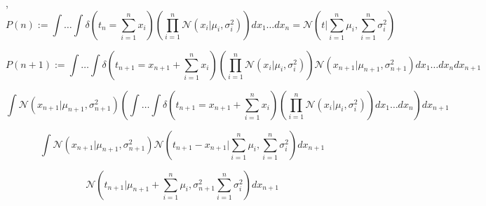 \documentclass[article]{jss}
\newif\ifen
\newif\ifes
\newcommand{\en}[1]{\ifen#1\fi}
\newcommand{\es}[1]{\ifes#1\fi}
\newcommand{\N}{\mathcal{N}}
\begin{document}
\en{Given},
\begin{equation}
 P(n) :=\int \dots \int \delta(t_n= \sum_{i=1}^n x_i ) \left( \prod_{i=1}^n \N(x_i|\mu_i,\sigma_i^2) \right) dx_1 \dots dx_n = \N(t|\sum_{i=1}^n \mu_i,\sum_{i=1}^n \sigma_i^2 )
\end{equation}
%
\en{We want to see that $P(n+1)$ is valid.}
\es{Queremos ver que $P(n+1)$ es válida.}
%
\begin{equation}
 P(n+1) := \int \dots \int \delta(t_{n+1}=x_{n+1} + \sum_{i=1}^{n} x_i ) \left( \prod_{i=1}^{n} \N(x_i|\mu_i,\sigma_i^2) \right) \N(x_{n+1}|\mu_{n+1},\sigma_{n+1}^2) dx_1 \dots dx_{n} dx_{n+1}
\end{equation}
%
\en{By independence}
\es{Por independencia}
\begin{equation}
 \int \N(x_{n+1}|\mu_{n+1},\sigma_{n+1}^2) \left( \int \dots \int \delta(t_{n+1}= x_{n+1} + \sum_{i=1}^{n} x_i ) \left( \prod_{i=1}^{n} \N(x_i|\mu_i,\sigma_i^2) \right)  dx_1 \dots dx_{n}\right) dx_{n+1}
\end{equation}
%
\en{By inductive hypothesis}
\es{Por hip\'otesis inductiva}
\begin{equation}
 \int \N(x_{n+1}|\mu_{n+1},\sigma_{n+1}^2) \N(t_{n+1}-x_{n+1}|\sum_{i=1}^n \mu_i,\sum_{i=1}^n \sigma_i^2) dx_{n+1}
\end{equation}
%
\en{By de proof of section~\ref{multiplicacion_normales}}
\es{Por la demostraci\'on de la secci\'on~\ref{multiplicacion_normales}}
\begin{equation}
  \N(t_{n+1}|\mu_{n+1}+\sum_{i=1}^{n} \mu_i,\sigma_{n+1}^2 \sum_{i=1}^n \sigma_i^2) dx_{n+1}
\end{equation}
%
\en{Therefore, $P(n+1)$ is valid}
\es{Luego, $P(n+1)$ es válida.}

\subsection{\en{A Gaussian multiplied by an cumulative Gaussian.}}
\end{document}
